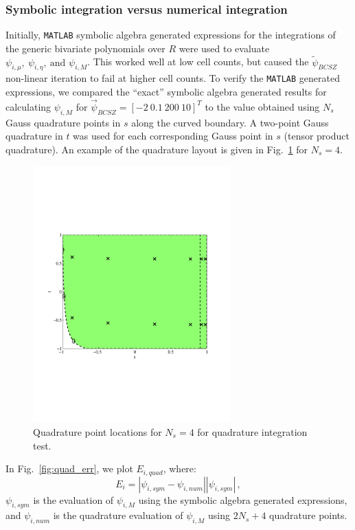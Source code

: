 \documentclass{mc2015}
\newcommand{\fig}[1]{Fig.~\ref{#1}}                      %
\newcommand{\benum}{\begin{equation}} 			%
\newcommand{\eenum}{\end{equation}}
\newcommand{\abs}[1]{\ensuremath{\left\lvert #1 \right\rvert}}
\newcommand{\BCSZ}{\ensuremath{\widetilde{\psi}_{BCSZ}}}
\newcommand{\pec}{\, ,}
\begin{document}
\subsubsection{Symbolic integration versus numerical integration}
Initially, \verb+MATLAB+\cite{matlab} symbolic algebra generated expressions for the integrations of the generic bivariate polynomials over $R$ were used to evaluate $\psi_{i,\mu},~\psi_{i,\eta},~\text{and }\psi_{i,M}$.  This worked well at low cell counts, but caused the \BCSZ non-linear iteration to fail at higher cell counts.
To verify the \verb+MATLAB+ generated expressions, we compared the ``exact'' symbolic algebra generated results for calculating $\psi_{i,M}$ for $\vec{\psi}_{BCSZ} = [-2 ~0.1~200~10]^T$ to the value obtained using $N_s$ Gauss quadrature points in $s$ along the curved boundary.  
A two-point Gauss quadrature in $t$ was used for each corresponding Gauss point in $s$ (tensor product quadrature).  An example of the quadrature layout is given in \fig{fig:quad} for $N_s = 4$.
\begin{figure}[h]
\centering
\includegraphics[width=3in,trim=0.5in  2.5in  1.in 2.5in,clip=true]{quad_layout.pdf}
\caption{Quadrature point locations for $N_s = 4$ for quadrature integration test.}
\label{fig:quad}
\end{figure}
In \fig{fig:quad_err}, we plot $E_{i,quad}$, where:
\benum
E_{i} = \abs{ \psi_{i,sym} - \psi_{i,num} }{\abs{\psi_{i,sym} }} \pec
\eenum
$\psi_{i,sym}$ is the evaluation of $\psi_{i,M}$ using the symbolic algebra generated expressions, and $\psi_{i,num}$ is the quadrature evaluation of $\psi_{i,M}$ using $2N_s + 4$ quadrature points.
\end{document}
